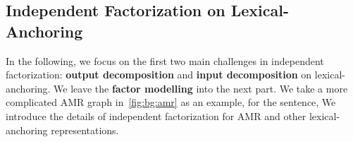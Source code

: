\subsection{Independent Factorization on Lexical-Anchoring}
\label{ssec:lex-phr:lex-factorization-analysis}
In the following, we focus on the first two main challenges in
independent factorization: \textbf{output decomposition} and
\textbf{input decomposition} on lexical-anchoring. We leave the
\textbf{factor modelling} into the next part.  We take a more
complicated AMR graph in~\autoref{fig:bg:amr} as an example, for the
sentence,  We introduce the details of
independent factorization for AMR and other lexical-anchoring
representations.


